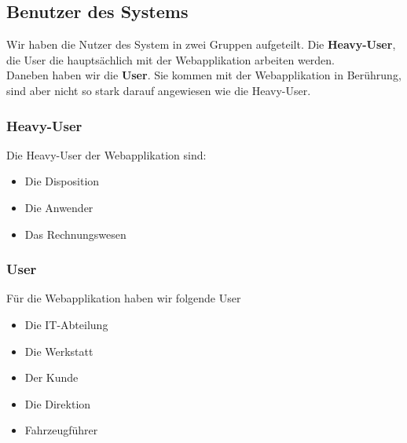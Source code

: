 \subsection{Benutzer des Systems}
Wir haben die Nutzer des System in zwei Gruppen aufgeteilt. Die \textbf{Heavy-User}, die User die hauptsächlich mit der Webapplikation arbeiten werden.\\
Daneben haben wir die \textbf{User}. Sie kommen mit der Webapplikation in Berührung, sind aber nicht so stark darauf angewiesen wie die Heavy-User.
%
\subsubsection{Heavy-User}
Die Heavy-User der Webapplikation sind:
\begin{itemize}
\item Die Disposition
\item Die Anwender
\item Das Rechnungswesen
\end{itemize}
%
\subsubsection{User}
Für die Webapplikation haben wir folgende User
\begin{itemize}
\item Die IT-Abteilung
\item Die Werkstatt
\item Der Kunde
\item Die Direktion
\item Fahrzeugführer
\end{itemize}